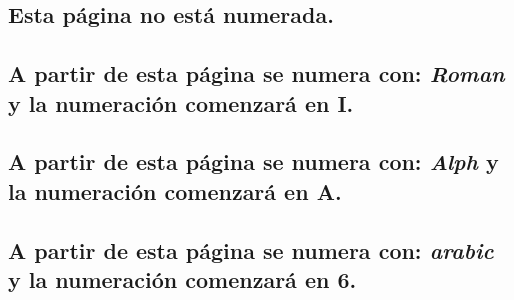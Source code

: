 \documentclass{article}
\begin{document}

	\subsection*{Esta p\'agina no est\'a numerada.}
	\newpage

	\subsection*{A partir de esta p\'agina se numera con: \textit{Roman} y la numeraci\'on comenzar\'a en I. }
	\newpage

	\subsection*{A partir de esta p\'agina se numera con: \textit{Alph} y la numeraci\'on comenzar\'a en A.}
	\newpage
	\setcounter{page}{6}

	\subsection*{A partir de esta p\'agina se numera con: \textit{arabic} y la numeraci\'on comenzar\'a en 6.}
\end{document}
